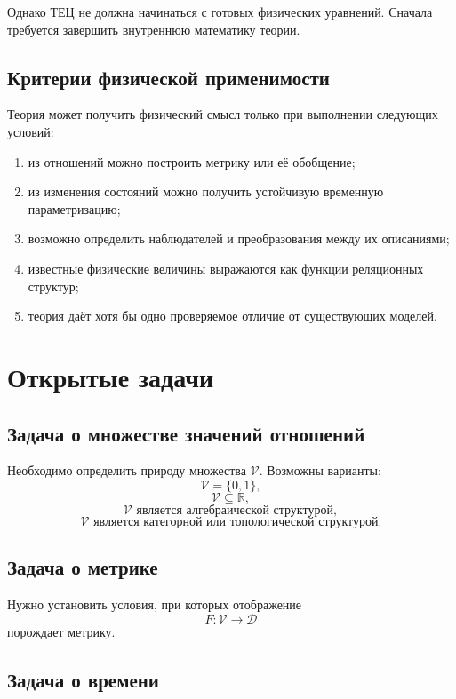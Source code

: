\documentclass[12pt,a4paper,oneside]{book}
\theoremstyle{definition}
\theoremstyle{plain}
\theoremstyle{remark}
\newcommand{\Values}{\mathcal V}
\newcommand{\DistVals}{\mathcal D}
\begin{document}
Однако ТЕЦ не должна начинаться с готовых физических уравнений. Сначала требуется завершить внутреннюю математику теории.

\section{Критерии физической применимости}

Теория может получить физический смысл только при выполнении следующих условий:

\begin{enumerate}
    \item из отношений можно построить метрику или её обобщение;
    \item из изменения состояний можно получить устойчивую временную параметризацию;
    \item возможно определить наблюдателей и преобразования между их описаниями;
    \item известные физические величины выражаются как функции реляционных структур;
    \item теория даёт хотя бы одно проверяемое отличие от существующих моделей.
\end{enumerate}

\chapter{Открытые задачи}

\section{Задача о множестве значений отношений}

Необходимо определить природу множества \(\Values\). Возможны варианты:
\[
\Values=\{0,1\},
\]
\[
\Values\subseteq\mathbb R,
\]
\[
\Values \text{ является алгебраической структурой},
\]
\[
\Values \text{ является категорной или топологической структурой}.
\]

\section{Задача о метрике}

Нужно установить условия, при которых отображение
\[
F:\Values\to\DistVals
\]
порождает метрику.

\section{Задача о времени}
\end{document}
